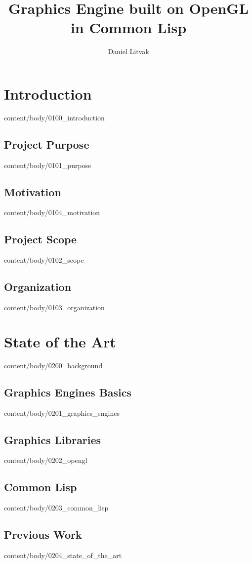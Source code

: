 \documentclass[english, tfg, loc, lof, covers, printable, firstnumbered, epsbased]{tfgtfmthesisuam}
\title{Graphics Engine built on OpenGL in Common Lisp}
\author{Daniel Litvak}
\begin{document}



\chapter{Introduction}{content/body/0100_introduction}                              %
  \section{Project Purpose}{content/body/0101_purpose}                              %
  \section{Motivation}{content/body/0104_motivation}                                %
  \section{Project Scope}{content/body/0102_scope}                                  %
  \section{Organization}{content/body/0103_organization}                            %

\chapter{State of the Art}{content/body/0200_background}                            %
  \section{Graphics Engines Basics}{content/body/0201_graphics_engines}             %
  \section{Graphics Libraries}{content/body/0202_opengl}                            %
  \section{Common Lisp}{content/body/0203_common_lisp}                              %
  \section{Previous Work}{content/body/0204_state_of_the_art}                       %
\end{document}

